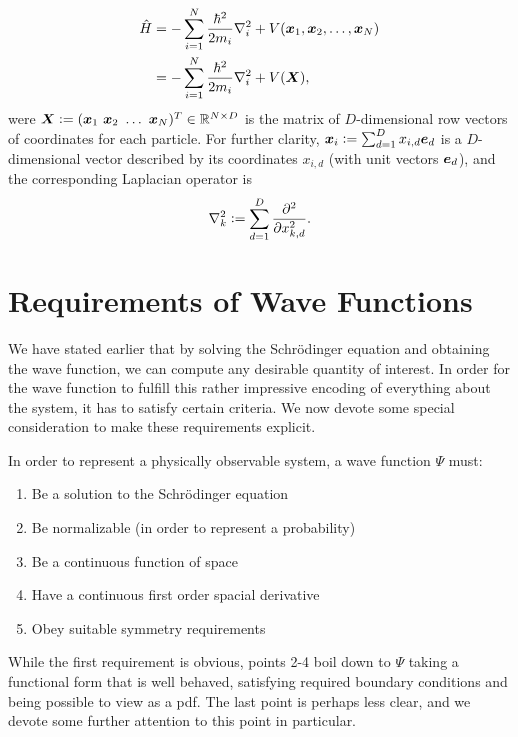 \documentclass[Thesis.tex]{subfiles}
\begin{document}
\begin{align}
    \hat H &= - \sum_{i=1}^N \frac{\hbar^2}{2m_i} \laplacian_i + V(\vb x_1, \vb x_2,\dots,
    \vb x_N)\\
    &= -\sum_{i=1}^N \frac{\hbar^2}{2m_i} \laplacian_i + V(\vb
    X),\label{eq:Hamiltonian-operator-general}
\end{align}
were $\bm{X} \vcentcolon= (\bm{x}_1\ \bm{x}_2\ \dots\ \bm{x}_N)^T\in \mathbb{R}^{N\times D}$ is the matrix
of $D$-dimensional row vectors of coordinates for each particle. For further clarity,
$\bm{x}_i \vcentcolon= \sum_{d=1}^D x_{i,d} \bm{e}_d$ is a $D$-dimensional vector described by
its coordinates $x_{i,d}$ (with unit vectors $\bm{e}_d$), and the corresponding Laplacian
operator is
\begin{align}
    \laplacian_k \defeq \sum_{d = 1}^D \pdv[2]{}{x_{k,d}}.
\end{align}


\section{Requirements of Wave Functions}\label{sec:requirements-of-wave-functions}

We have stated earlier that by solving the Schrödinger equation and obtaining the wave
function, we can compute any desirable quantity of interest. In order for the wave
function to fulfill this rather impressive encoding of everything about the system, it has
to satisfy certain criteria. We now devote some special consideration to make these
requirements explicit.

In order to represent a physically observable system, a wave function $\Psi$ must:
\begin{enumerate}
    \item Be a solution to the Schrödinger equation
    \item Be normalizable (in order to represent a probability)
    \item Be a continuous function of space
    \item Have a continuous first order spacial derivative
    \item Obey suitable symmetry requirements
\end{enumerate}
%
While the first requirement is obvious, points 2-4 boil down to $\Psi$ taking a
functional form that is well behaved, satisfying required boundary conditions and being
possible to view as a \gls{pdf}. The last point is perhaps less clear, and
we devote some further attention to this point in particular.
\end{document}
